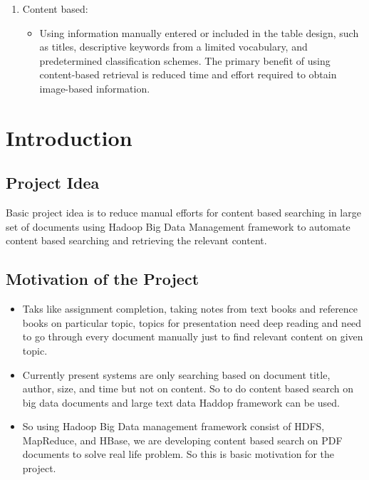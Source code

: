 \documentclass[oneside,a4paper,12pt]{report}
\begin{document}
\begin{enumerate}
\item Content based:
\begin{itemize}
\item Using information manually entered or included in the table design, such as titles, descriptive keywords from a limited vocabulary, and predetermined classification schemes. The primary benefit of using content-based retrieval is reduced time and effort required to obtain image-based information.
\end{itemize}

\end{enumerate}

			

\chapter{Introduction}
\section{Project Idea}
Basic project idea is to reduce manual efforts for content based searching in large set of documents using Hadoop Big Data Management framework to automate content based searching and retrieving the relevant content. 


\section{Motivation of the Project}  
\begin{itemize}
\item Taks like assignment completion, taking notes from text books and reference books on particular topic, topics for presentation need deep reading and need to go through every document manually just to find relevant content on given topic.
\item Currently present systems are only searching based on document title, author, size, and time but not on content. So to do content based search on big data documents and large text data Haddop framework can be used.
\item So using Hadoop Big Data management framework consist of HDFS, MapReduce, and HBase, we are developing content based search on PDF documents to solve real life problem. So this is basic motivation for the project.
\end{itemize}

\newpage
\end{document}

